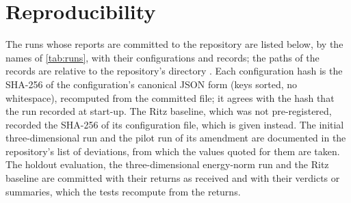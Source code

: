 \section{Reproducibility}\label{app:repro}

The runs whose reports are committed to the repository are listed below, by the names of
\cref{tab:runs}, with their configurations and records; the paths of the records are
relative to the repository's directory . Each configuration hash is the
SHA-256 of the configuration's canonical JSON form (keys sorted, no whitespace), recomputed
from the committed file; it agrees with the hash that the run recorded at start-up. The
Ritz baseline, which was not pre-registered, recorded the SHA-256 of its configuration file,
which is given instead. The initial three-dimensional run and the pilot run of its amendment
are documented in the repository's list of deviations, from which the values quoted for
them are taken. The holdout evaluation, the three-dimensional energy-norm run and the
Ritz baseline are committed with their returns as received and with their verdicts or
summaries, which the tests recompute from the returns.



